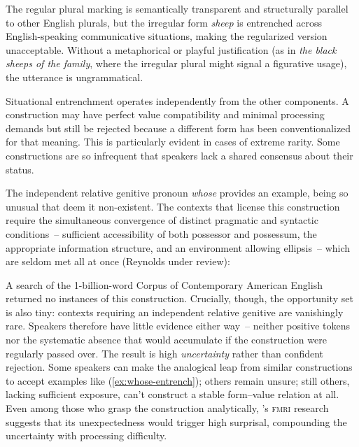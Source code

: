 \documentclass[12pt,letterpaper]{article}
\newcommand{\mention}[1]{\textit{#1}}
\newcommand{\abbr}[1]{\textsc{#1}}
\begin{document}
\label{ex:sheeps-entrench}
\z

The regular plural marking is semantically transparent and structurally parallel to other English plurals, but the irregular form \mention{sheep} is entrenched across English-speaking communicative situations, making the regularized version unacceptable. Without a metaphorical or playful justification (as in \mention{the black sheeps of the family}, where the irregular plural might signal a figurative usage), the utterance is ungrammatical.

Situational entrenchment operates independently from the other components. A construction may have perfect value compatibility and minimal processing demands but still be rejected because a different form has been conventionalized for that meaning. This is particularly evident in cases of extreme rarity. Some constructions are so infrequent that speakers lack a shared consensus about their status. 

The independent relative genitive pronoun \mention{whose} provides an example, being so unusual that \textcite{hankamer1973whose} deem it non-existent. The contexts that license this construction require the simultaneous convergence of distinct pragmatic and syntactic conditions~-- sufficient accessibility of both possessor and possessum, the appropriate information structure, and an environment allowing ellipsis~-- which are seldom met all at once (Reynolds under review):

\z

A search of the 1-billion-word Corpus of Contemporary American English returned no instances of this construction. Crucially, though, the opportunity set is also tiny: contexts requiring an independent relative genitive are vanishingly rare. Speakers therefore have little evidence either way~-- neither positive tokens nor the systematic absence that would accumulate if the construction were regularly passed over. The result is high \emph{uncertainty} rather than confident rejection. Some speakers can make the analogical leap from similar constructions to accept examples like (\ref{ex:whose-entrench}); others remain unsure; still others, lacking sufficient exposure, can't construct a stable form--value relation at all. Even among those who grasp the construction analytically, \textcite{shain2020fmri}'s \abbr{fmri} research suggests that its unexpectedness would trigger high surprisal, compounding the uncertainty with processing difficulty.
\end{document}

